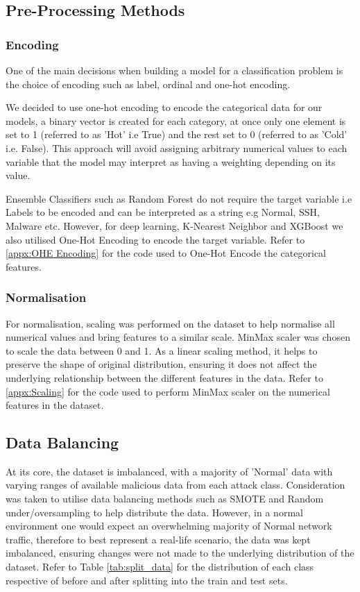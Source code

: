 \subsection{Pre-Processing Methods}

\subsubsection{Encoding}

One of the main decisions when building a model for a classification problem is the choice of encoding such as label, ordinal and one-hot encoding.

We decided to use one-hot encoding to encode the categorical data for our models, a binary vector is created for each category, at once only one element is set to 1 (referred to as 'Hot' i.e True) and the rest set to 0 (referred to as 'Cold' i.e. False). This approach will avoid assigning arbitrary numerical values to each variable that the model may interpret as having a weighting depending on its value. 

Ensemble Classifiers such as Random Forest do not require the target variable i.e Labels to be encoded and can be interpreted as a string e.g Normal, SSH, Malware etc. However, for deep learning, K-Nearest Neighbor and XGBoost we also utilised One-Hot Encoding to encode the target variable. Refer to \ref{appx:OHE Encoding} for the code used to One-Hot Encode the categorical features. 


\subsubsection{Normalisation}

For normalisation, scaling was performed on the dataset to help normalise all numerical values and bring features to a similar scale. MinMax scaler was chosen to scale the data between 0 and 1. As a linear scaling method, it helps to preserve the shape of original distribution, ensuring it does not affect the underlying relationship between the different features in the data. Refer to \ref{appx:Scaling} for the code used to perform MinMax scaler on the numerical features in the dataset.

\subsection{Data Balancing}

At its core, the dataset is imbalanced, with a majority of 'Normal' data with varying ranges of available malicious data from each attack class. Consideration was taken to utilise data balancing methods such as SMOTE and Random under/oversampling to help distribute the data. However, in a normal environment one would expect an overwhelming majority of Normal network traffic, therefore to best represent a real-life scenario, the data was kept imbalanced, ensuring changes were not made to the underlying distribution of the dataset. Refer to Table \ref{tab:split_data} for the distribution of each class respective of before and after splitting into the train and test sets.

